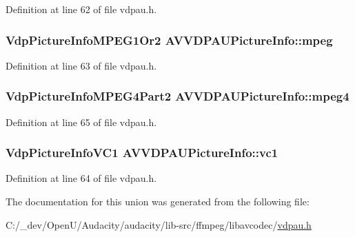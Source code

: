 Definition at line 62 of file vdpau.\+h.

\subsubsection[{\texorpdfstring{mpeg}{mpeg}}]{\setlength{\rightskip}{0pt plus 5cm}Vdp\+Picture\+Info\+M\+P\+E\+G1\+Or2 A\+V\+V\+D\+P\+A\+U\+Picture\+Info\+::mpeg}\hypertarget{union_a_v_v_d_p_a_u_picture_info_a0953a7bad8855265a7dc4959d7ef7316}{}\label{union_a_v_v_d_p_a_u_picture_info_a0953a7bad8855265a7dc4959d7ef7316}


Definition at line 63 of file vdpau.\+h.

\subsubsection[{\texorpdfstring{mpeg4}{mpeg4}}]{\setlength{\rightskip}{0pt plus 5cm}Vdp\+Picture\+Info\+M\+P\+E\+G4\+Part2 A\+V\+V\+D\+P\+A\+U\+Picture\+Info\+::mpeg4}\hypertarget{union_a_v_v_d_p_a_u_picture_info_a03ba529bc77155578dd37aee7bb86af9}{}\label{union_a_v_v_d_p_a_u_picture_info_a03ba529bc77155578dd37aee7bb86af9}


Definition at line 65 of file vdpau.\+h.

\subsubsection[{\texorpdfstring{vc1}{vc1}}]{\setlength{\rightskip}{0pt plus 5cm}Vdp\+Picture\+Info\+V\+C1 A\+V\+V\+D\+P\+A\+U\+Picture\+Info\+::vc1}\hypertarget{union_a_v_v_d_p_a_u_picture_info_a0d054be4e5fbebdc6d723f6a1498117e}{}\label{union_a_v_v_d_p_a_u_picture_info_a0d054be4e5fbebdc6d723f6a1498117e}


Definition at line 64 of file vdpau.\+h.



The documentation for this union was generated from the following file\+:\begin{DoxyCompactItemize}
\item 
C\+:/\+\_\+dev/\+Open\+U/\+Audacity/audacity/lib-\/src/ffmpeg/libavcodec/\hyperlink{vdpau_8h}{vdpau.\+h}\end{DoxyCompactItemize}
